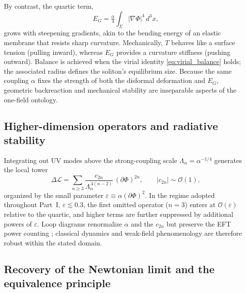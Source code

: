 \documentclass{article}
\begin{document}
By contrast, the quartic term,
\begin{equation}
E_G = \tfrac{\alpha}{4}\int_{\Sigma} |\nabla\Phi|^4 \, d^3x ,
\label{eq:EG_energy_def}
\end{equation}
grows with steepening gradients, akin to the bending energy of an elastic membrane that resists sharp curvature. Mechanically, $T$ behaves like a surface tension (pulling inward), whereas $E_G$ provides a curvature stiffness (pushing outward). Balance is achieved when the virial identity \eqref{eq:virial_balance} holds; the associated radius defines the soliton’s equilibrium size. Because the same coupling $\alpha$ fixes the strength of both the disformal deformation and $E_G$, geometric backreaction and mechanical stability are inseparable aspects of the one-field ontology.

\subsection{Higher-dimension operators and radiative stability}
\label{subsec:higher_ops}

Integrating out UV modes above the strong-coupling scale $\Lambda_\alpha=\alpha^{-1/4}$ generates the local tower
\begin{equation}
\Delta\mathcal{L} = \sum_{n\ge3} \frac{c_{2n}}{\Lambda_\alpha^{\,4(n-2)}}\,(\partial\Phi)^{2n},
\qquad |c_{2n}|\sim\mathcal{O}(1),
\label{eq:HD_tower}
\end{equation}
organized by the small parameter $\varepsilon\equiv \alpha(\partial\Phi)^2$.
In the regime adopted throughout Part~I, $\varepsilon\lesssim 0.3$, the first omitted operator ($n=3$) enters at $\mathcal{O}(\varepsilon)$ relative to the quartic, and higher terms are further suppressed by additional powers of $\varepsilon$. Loop diagrams renormalize $\alpha$ and the $c_{2n}$ but preserve the EFT power counting \cite{Burgess2007_EFT,Burgess2020_EFTbook}; classical dynamics and weak-field phenomenology are therefore robust within the stated domain.

\subsection{Recovery of the Newtonian limit and the equivalence principle}
\label{subsec:PPN_outline}
\end{document}

